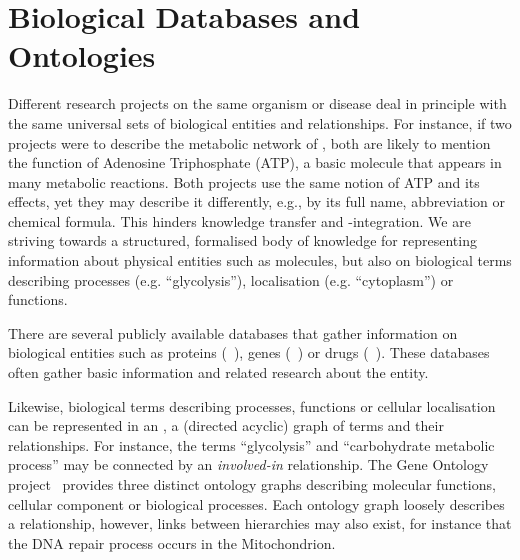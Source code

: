 \documentclass[
	fontsize=10pt, %
	twoside=true, %
	secnumdepth=1, %
  toc=indentunnumbered %
]{kaobook}
\begin{document}
\section{Biological Databases and Ontologies}%
\label{sec:ontologies}



Different research projects on the same organism or disease deal in principle
with the same universal sets of biological entities and relationships. For
instance, if two projects were to describe the metabolic network of \ecoli, both
are likely to mention the function of Adenosine Triphosphate (ATP), a basic
molecule that appears in many metabolic reactions. Both projects use the same
notion of ATP and its effects, yet they may describe it differently, e.g., by
its full name, abbreviation or
chemical formula. This hinders knowledge transfer and -integration. We are
striving towards a structured, formalised body of knowledge for representing
information about physical entities such as molecules, but also on biological terms
describing processes (e.g. ``glycolysis''), localisation (e.g. ``cytoplasm'') or
functions.

There are several publicly available databases that gather information on
biological entities such as proteins (~\cite{theuniprotconsortium_UniProtUniversalProtein_2021}), genes
(~\cite{maglott_EntrezGeneGenecentered_2005}) or drugs
(~\cite{wishart_DrugBankKnowledgebaseDrugs_2008}). These
databases often gather basic information and related research about the entity.

Likewise, biological terms describing processes, functions or cellular
localisation can be represented in an , a (directed acyclic) graph
of terms and their relationships. For instance, the terms ``glycolysis'' and
``carbohydrate metabolic process'' may be connected by an \textit{involved-in}
relationship. The Gene Ontology project~\cite{ashburner_GeneOntologyTool_2000}
provides three distinct ontology graphs describing molecular functions, cellular
component or biological processes. Each ontology graph loosely describes a
relationship, however, links between hierarchies may also exist, for instance
that the DNA repair process occurs in the Mitochondrion.
\end{document}
